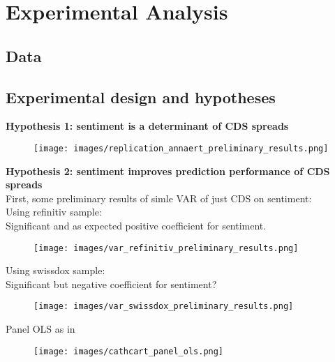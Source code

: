 \chapter{Experimental Analysis}\label{sec5}
\thispagestyle{empty}

\section{Data}

\section{Experimental design and hypotheses}

\textbf{Hypothesis 1: sentiment is a determinant of CDS spreads}
\cite{annaert2013} \\

\begin{figure}[h]
\texttt{[image: images/replication\_annaert\_preliminary\_results.png]}
\end{figure}

\newpage

\noindent
\textbf{Hypothesis 2: sentiment improves prediction performance of CDS spreads}
\cite{cathcart2020} \\

\noindent
First, some preliminary results of simle VAR of just CDS on sentiment: \\

\noindent
Using refinitiv sample:\\
Significant and as expected positive coefficient for sentiment.

\begin{figure}[h]
\texttt{[image: images/var\_refinitiv\_preliminary\_results.png]}
\end{figure}

\newpage
\noindent
Using swissdox sample:\\
Significant but negative coefficient for sentiment?
\begin{figure}[h]
\texttt{[image: images/var\_swissdox\_preliminary\_results.png]}
\end{figure}

\newpage
\noindent
Panel OLS as in \cite{cathcart2020}

\begin{figure}[h]
\texttt{[image: images/cathcart\_panel\_ols.png]}
\end{figure}

